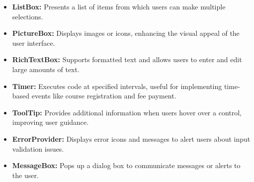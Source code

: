 \documentclass[12pt,a4paper]{article}
\begin{document}
\begin{itemize}
    \item \textbf{ListBox:} Presents a list of items from which users can make multiple selections.

    \item \textbf{PictureBox:} Displays images or icons, enhancing the visual appeal of the user interface.

    \item \textbf{RichTextBox:} Supports formatted text and allows users to enter and edit large amounts of text.

    \item \textbf{Timer:} Executes code at specified intervals, useful for implementing time-based events like course registration and fee payment.

    \item \textbf{ToolTip:} Provides additional information when users hover over a control, improving user guidance.





    \item \textbf{ErrorProvider:} Displays error icons and messages to alert users about input validation issues.

    \item \textbf{MessageBox:} Pops up a dialog box to communicate messages or alerts to the user.


    \end{itemize}
\end{document}
